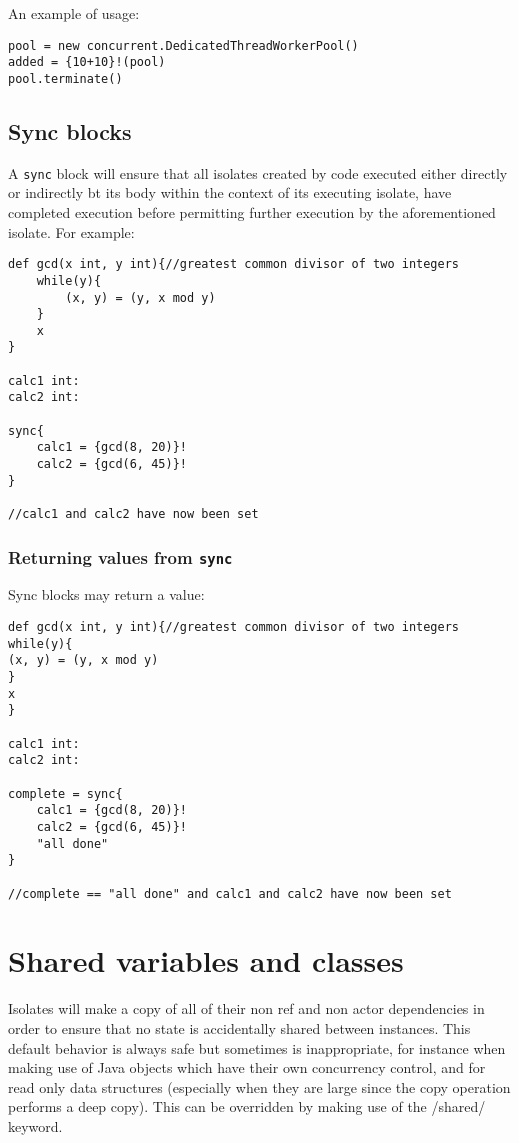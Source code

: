 \documentclass[conc-doc]{subfiles}
\begin{document}
An example of usage:

\begin{lstlisting}
pool = new concurrent.DedicatedThreadWorkerPool()
added = {10+10}!(pool)
pool.terminate()
\end{lstlisting}

\subsection{Sync blocks}
A \lstinline{sync} block will ensure that all isolates created by code executed either directly or indirectly bt its body within the context of its executing isolate, have completed execution before permitting further execution by the aforementioned isolate. For example:

\begin{lstlisting}
def gcd(x int, y int){//greatest common divisor of two integers
	while(y){
		(x, y) = (y, x mod y)
	}
	x
}

calc1 int:
calc2 int:

sync{
	calc1 = {gcd(8, 20)}!
	calc2 = {gcd(6, 45)}!
}

//calc1 and calc2 have now been set
\end{lstlisting}

\subsubsection{Returning values from \lstinline{sync}}
Sync blocks may return a value:

\begin{lstlisting}
def gcd(x int, y int){//greatest common divisor of two integers
while(y){
(x, y) = (y, x mod y)
}
x
}

calc1 int:
calc2 int:

complete = sync{
	calc1 = {gcd(8, 20)}!
	calc2 = {gcd(6, 45)}!
	"all done"
}

//complete == "all done" and calc1 and calc2 have now been set
\end{lstlisting}

\section{Shared variables and classes}
\label{sec:shared}
Isolates will make a copy of all of their non ref and non actor dependencies in order to ensure that no state is accidentally shared between instances. This default behavior is always safe but sometimes is inappropriate, for instance when making use of Java objects which have their own concurrency control, and for read only data structures (especially when they are large since the copy operation performs a deep copy). This can be overridden by making use of the /shared/ keyword.
\end{document}
